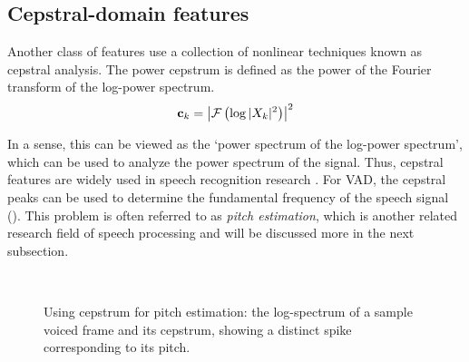 


\subsection{Cepstral-domain features}
Another class of features use a collection of nonlinear techniques known as cepstral analysis.
The power cepstrum is defined as the power of the Fourier transform of the log-power spectrum.
\begin{equation}
    \mathbf{c}_k = \left| \mathcal{F}\left(\log |X_k|^2 \right) \right|^2
\end{equation}

In a sense, this can be viewed as the `power spectrum of the log-power spectrum', which can be used to analyze the power spectrum of the signal.
Thus, cepstral features are widely used in speech recognition research \cite{rabiner1978digital}.
For VAD, the cepstral peaks can be used to determine the fundamental frequency of the speech signal \cite{rabiner1978digital,noll1967cepstrum,ahmadi1999cepstrum} ().
This problem is often referred to as \emph{pitch estimation}, which is another related research field of speech processing and will be discussed more in the next subsection.



\begin{figure}[hh] %
    \centering
     \\
    \caption[Using cepstrum for pitch estimation]{Using cepstrum for pitch estimation:  the log-spectrum of a sample voiced frame and  its cepstrum, showing a distinct spike corresponding to its pitch.}
    \label{Fig:DFT_voiced_frame_clean}
\end{figure}


